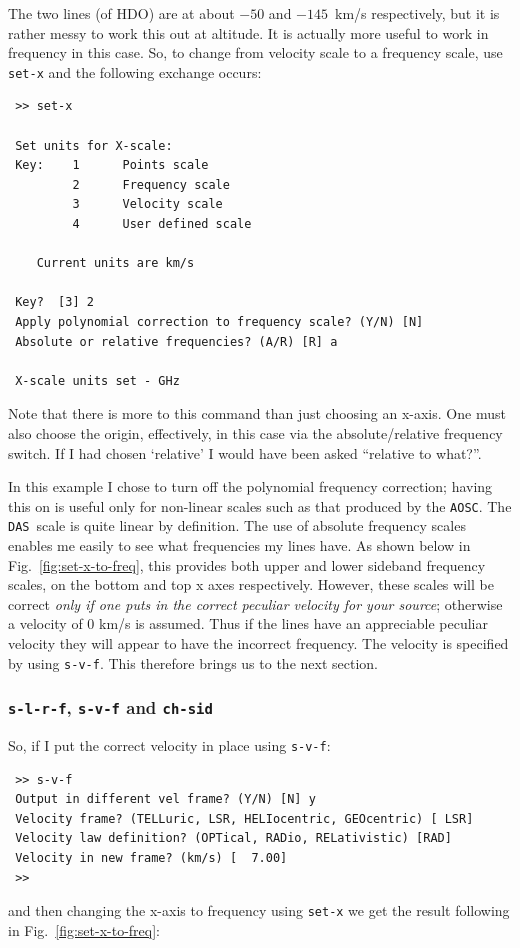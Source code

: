 \documentclass[11pt,twoside]{article}
\newcommand{\das}{{\tt DAS}}
\newcommand{\aosc}{{\tt AOSC}}
\begin{document}
The two lines (of HDO) are at about $-50$ and $-145$~km/s
respectively, but it is rather messy to work this out at altitude.  It
is actually more useful to work in frequency in this case. So, 
to change from velocity scale to a frequency scale, use {\tt set-x}
and the following exchange occurs: 

\begin{verbatim}
 >> set-x
 
 Set units for X-scale:
 Key:    1      Points scale
         2      Frequency scale
         3      Velocity scale
         4      User defined scale
 
    Current units are km/s  
 
 Key?  [3] 2
 Apply polynomial correction to frequency scale? (Y/N) [N] 
 Absolute or relative frequencies? (A/R) [R] a
 
 X-scale units set - GHz 
\end{verbatim} 

Note that there is more to this command than just choosing an
x-axis. One must also choose the origin, effectively, in this case via
the absolute/relative frequency switch. If I had chosen `relative' I
would have been asked ``relative to what?''.

In this example I chose to turn off the polynomial frequency
correction; having this on is useful only for non-linear scales such as
that produced
by the \aosc . The \das\ scale is quite linear by definition. The use
of absolute frequency scales enables me easily to see what frequencies
my lines have. As shown below in Fig.~\ref{fig:set-x-to-freq}, 
this provides both upper and lower
sideband frequency scales, on the bottom and top x axes
respectively. However, these scales will be correct {\it only if one
puts in the correct peculiar velocity for your source}; otherwise a
velocity of 0 km/s is assumed. Thus if the lines have an appreciable
peculiar velocity they will appear to have the incorrect
frequency. The velocity is specified by using {\tt s-v-f}. This
therefore brings us to the next section.

\subsubsection{{\tt s-l-r-f}, {\tt s-v-f} and {\tt ch-sid}}
\label{sec:s-l-r-f}
So, if I put the correct velocity in place using {\tt s-v-f}:
\begin{verbatim}
 >> s-v-f
 Output in different vel frame? (Y/N) [N] y
 Velocity frame? (TELLuric, LSR, HELIocentric, GEOcentric) [ LSR] 
 Velocity law definition? (OPTical, RADio, RELativistic) [RAD] 
 Velocity in new frame? (km/s) [  7.00] 
 >> 
\end{verbatim}
and then changing the x-axis to frequency using {\tt set-x} we get the
result following in Fig.~\ref{fig:set-x-to-freq}:
\end{document}
